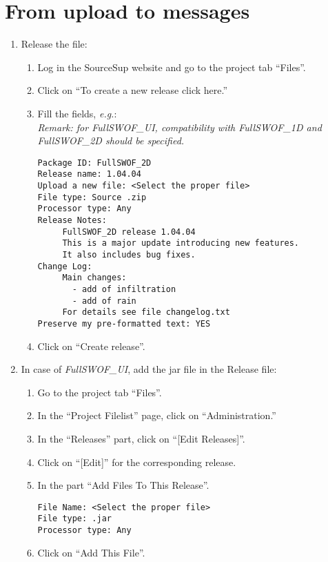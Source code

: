 \documentclass[a4paper, 11pt]{article}
\newcommand{\FullSWOFoneD}{\emph{FullSWOF\_1D}}
\newcommand{\FullSWOFtwoD}{\emph{FullSWOF\_2D}}
\newcommand{\FullSWOFUI}{\emph{FullSWOF\_UI}}
\begin{document}
\section{From upload to messages}
\begin{enumerate}
\item Release the file:
\begin{enumerate}
\item Log in the SourceSup website and go to the project tab ``Files''.
\item Click on ``To create a new release click here.''
\item Fill the fields, \emph{e.g.}:\\
\emph{Remark: for \FullSWOFUI, compatibility with \FullSWOFoneD{} and \FullSWOFtwoD{} should be specified.}
\begin{verbatim}
Package ID: FullSWOF_2D
Release name: 1.04.04
Upload a new file: <Select the proper file>
File type: Source .zip
Processor type: Any
Release Notes:
     FullSWOF_2D release 1.04.04
     This is a major update introducing new features.
     It also includes bug fixes.
Change Log:
     Main changes:
       - add of infiltration
       - add of rain
     For details see file changelog.txt
Preserve my pre-formatted text: YES
\end{verbatim}
\item Click on ``Create release''.
\end{enumerate}

\color[gray]{0.4}
\item In case of \FullSWOFUI{}, add the jar file in the Release file:
\begin{enumerate}
\item Go to the project tab ``Files''.
\item In the ``Project Filelist'' page, click on ``Administration.''
\item In the ``Releases'' part, click on ``[Edit Releases]''.
\item Click on ``[Edit]'' for the corresponding release.
\item In the part ``Add Files To This Release''.
\begin{verbatim}
File Name: <Select the proper file>
File type: .jar
Processor type: Any
\end{verbatim}
\item Click on ``Add This File''.

\end{enumerate}

\color{black}


\end{enumerate}
\end{document}
